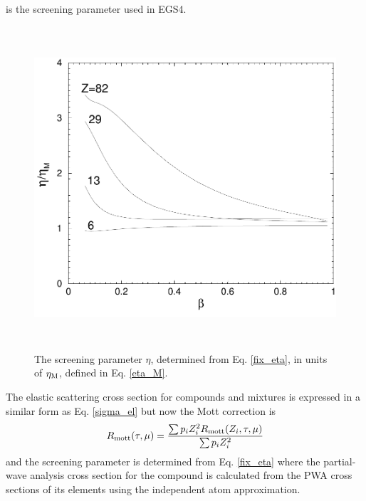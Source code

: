 is the screening parameter used in EGS4.
\begin{figure}[htp]
\includegraphics[height=12cm,width=12cm]{figures/eta}
\caption[Screening parameter]{\label{fig_eta} The screening parameter $\eta$,
determined from Eq. \protect\eqref{fix_eta}, in units of
$\eta_{\rm M}$, defined in Eq. \protect\eqref{eta_M}.}
\end{figure}

The elastic scattering cross section for compounds and
mixtures is expressed in a similar form as Eq. \eqref{sigma_el}
but now the Mott correction is
\begin{equation}
R_{\rm mott}(\tau,\mu) = {\sum p_i Z_i^2 R_{\rm mott}(Z_i,\tau,\mu) \over
\sum p_i Z_i^2}
\end{equation}
and the screening parameter is determined from Eq. \eqref{fix_eta} where
the partial-wave analysis cross section for the compound is
calculated from the PWA cross sections of its elements using
the independent atom approximation.

